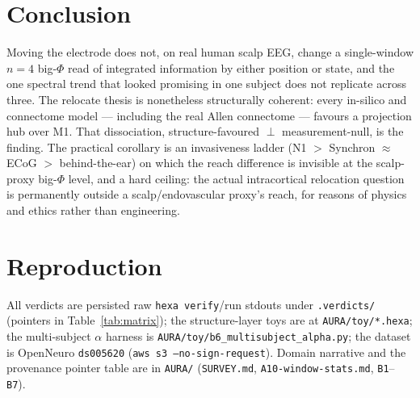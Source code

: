 \documentclass[11pt,a4paper]{article}
\begin{document}
\section{Conclusion}\label{sec:conclusion}

Moving the electrode does not, on real human scalp EEG, change a single-window
$n{=}4$ big-$\Phi$ read of integrated information by either position or state,
and the one spectral trend that looked promising in one subject does not
replicate across three. The relocate thesis is nonetheless structurally
coherent: every in-silico and connectome model --- including the real Allen
connectome --- favours a projection hub over M1. That dissociation,
structure-favoured $\perp$ measurement-null, is the finding. The practical
corollary is an invasiveness ladder (N1 $>$ Synchron $\approx$ ECoG $>$
behind-the-ear) on which the reach difference is invisible at the scalp-proxy
big-$\Phi$ level, and a hard ceiling: the actual intracortical relocation
question is permanently outside a scalp/endovascular proxy's reach, for reasons
of physics and ethics rather than engineering.

\appendix
\section{Reproduction}\label{app:repro}
All verdicts are persisted raw \texttt{hexa verify}/run stdouts under
\texttt{.verdicts/} (pointers in Table~\ref{tab:matrix}); the structure-layer
toys are at \texttt{AURA/toy/*.hexa}; the multi-subject $\alpha$ harness is
\texttt{AURA/toy/b6\_multisubject\_alpha.py}; the dataset is OpenNeuro
\texttt{ds005620} (\texttt{aws s3 --no-sign-request}). Domain narrative and the
provenance pointer table are in \texttt{AURA/} (\texttt{SURVEY.md},
\texttt{A10-window-stats.md}, \texttt{B1}--\texttt{B7}).



\end{document}
